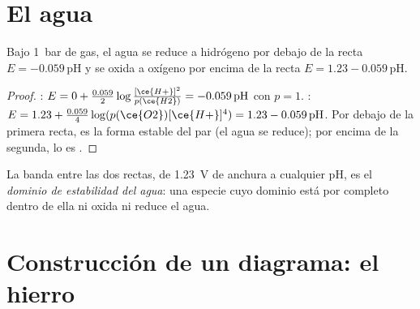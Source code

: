 \section{El agua}

\begin{proposition}\label{prop:b1:e-ph-diagrams:water-lines}
Bajo \qty{1}{bar} de gas, el agua se reduce a hidrógeno por debajo de la
recta $E = -0.059\,\mathrm{pH}$ y se oxida a oxígeno por encima de la
recta $E = 1.23
- 0.059\,\mathrm{pH}$.
\end{proposition}

\begin{proof}
: $E = 0 + \frac{0.059}{2}\log\frac{[\ce{H+}]^2}{p(\ce{H2})}
= -0.059\,\mathrm{pH}$ con $p = 1$. : $E = 1.23 +
\frac{0.059}{4}\log(p(\ce{O2})[\ce{H+}]^4) = 1.23 - 0.059\,\mathrm{pH}$. Por
debajo de la primera recta,  es la forma estable del par (el agua
se reduce); por encima de la segunda, lo es .
\end{proof}

\begin{definition}\label{def:b1:e-ph-diagrams:water-domain}
La banda entre las dos rectas, de \qty{1.23}{V} de anchura a cualquier
pH, es el \emph{dominio de estabilidad del agua}:
una especie cuyo dominio está por completo dentro de ella ni oxida ni
reduce el agua.
\end{definition}

\section{Construcción de un diagrama: el hierro}

